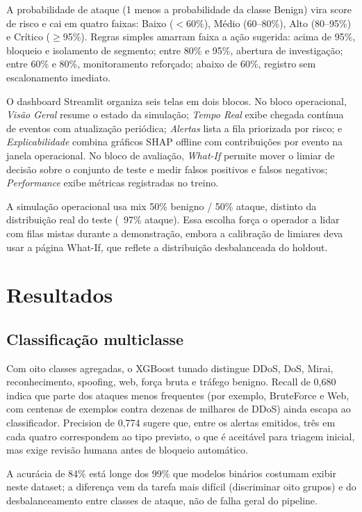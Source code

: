 \documentclass[12pt]{article}
\begin{document}
A probabilidade de ataque (1 menos a probabilidade da classe Benign) vira score de risco e cai em quatro faixas: Baixo ($<$60\%), Médio (60--80\%), Alto (80--95\%) e Crítico ($\geq$95\%).
Regras simples amarram faixa a ação sugerida: acima de 95\%, bloqueio e isolamento de segmento; entre 80\% e 95\%, abertura de investigação; entre 60\% e 80\%, monitoramento reforçado; abaixo de 60\%, registro sem escalonamento imediato.

O dashboard Streamlit organiza seis telas em dois blocos.
No bloco operacional, \textit{Visão Geral} resume o estado da simulação; \textit{Tempo Real} exibe chegada contínua de eventos com atualização periódica; \textit{Alertas} lista a fila priorizada por risco; e \textit{Explicabilidade} combina gráficos SHAP offline com contribuições por evento na janela operacional.
No bloco de avaliação, \textit{What-If} permite mover o limiar de decisão sobre o conjunto de teste e medir falsos positivos e falsos negativos; \textit{Performance} exibe métricas registradas no treino.

A simulação operacional usa mix 50\% benigno / 50\% ataque, distinto da distribuição real do teste (~97\% ataque).
Essa escolha força o operador a lidar com filas mistas durante a demonstração, embora a calibração de limiares deva usar a página What-If, que reflete a distribuição desbalanceada do holdout.

\section{Resultados}

\subsection{Classificação multiclasse}

Com oito classes agregadas, o XGBoost tunado distingue DDoS, DoS, Mirai, reconhecimento, spoofing, web, força bruta e tráfego benigno.
Recall de 0,680 indica que parte dos ataques menos frequentes (por exemplo, BruteForce e Web, com centenas de exemplos contra dezenas de milhares de DDoS) ainda escapa ao classificador.
Precision de 0,774 sugere que, entre os alertas emitidos, três em cada quatro correspondem ao tipo previsto, o que é aceitável para triagem inicial, mas exige revisão humana antes de bloqueio automático.

A acurácia de 84\% está longe dos 99\% que modelos binários costumam exibir neste dataset; a diferença vem da tarefa mais difícil (discriminar oito grupos) e do desbalanceamento entre classes de ataque, não de falha geral do pipeline.
\end{document}
